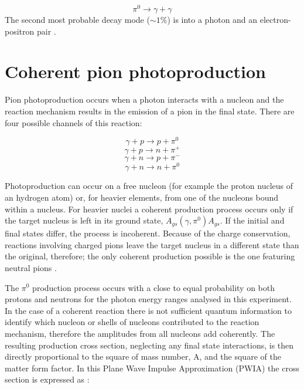 \begin{equation}
\pi^{0} \rightarrow \gamma + \gamma
\end{equation}
The second most probable decay mode ($\sim1\%$) is into a photon and an electron-positron pair \cite{amsler}.

\section{Coherent pion photoproduction}

\indent Pion photoproduction occurs when a photon interacts with a nucleon and the reaction mechanism results in the emission of a pion in the final state. There are four possible channels of this reaction:

\begin{equation}
\gamma + p \rightarrow p + \pi^{0}
\end{equation}
\begin{equation}
\gamma + p \rightarrow n + \pi^{+}
\end{equation}
\begin{equation}
\gamma + n \rightarrow p + \pi^{-}
\end{equation}
\begin{equation}
\gamma + n \rightarrow n + \pi^{0}
\end{equation}

\indent Photoproduction can occur on a free nucleon (for example the proton nucleus of an hydrogen atom) or, for heavier elements, from one of the nucleons bound within a nucleus. For heavier nuclei a coherent production process occurs only if the target nucleus is left in its ground state, $A_{gs}(\gamma,\pi^{0})A_{gs}$. If the initial and final states differ, the process is incoherent. Because of the charge conservation, reactions involving charged pions leave the target nucleus in a different state than the original, therefore; the only coherent production possible is the one featuring neutral pions \cite{claire}.

\indent The $\pi^{0}$ production process occurs with a close to equal probability on both protons and neutrons for the photon energy ranges analysed in this experiment. In the case of a coherent reaction there is not sufficient quantum information to identify which nucleon or shells of nucleons contributed to the reaction mechanism, therefore the amplitudes from all nucleons add coherently. The resulting production cross section, neglecting any final state interactions,  is then directly proportional to the square of mass number, A, and the square of the matter form factor. In this Plane Wave Impulse Approximation (PWIA) the cross section is expressed as \cite{drechsel2}:

